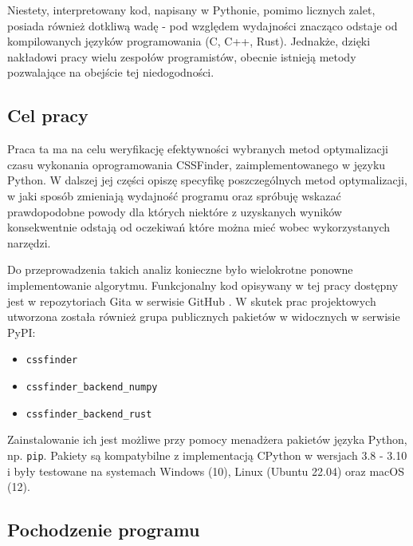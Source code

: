 \documentclass[12pt, a4paper]{article}
\newcommand{\code}[1]{\texttt{#1}}
\begin{document}
\begin{sloppypar}
    Niestety, interpretowany kod, napisany w Pythonie, pomimo licznych zalet, posiada również
    dotkliwą wadę - pod względem wydajności znacząco odstaje od kompilowanych języków programowania
    (C\cite{C_vs_Python}, C++\cite{Cpp_vs_Python}, Rust\cite{Rust_vs_Python}). Jednakże,
    dzięki nakładowi pracy wielu zespołów programistów, obecnie istnieją metody pozwalające
    na obejście tej niedogodności.

    \subsection{Cel pracy}


    Praca ta ma na celu weryfikację efektywności wybranych metod optymalizacji czasu wykonania
    oprogramowania CSSFinder, zaimplementowanego w języku Python. W dalszej jej części opiszę
    specyfikę poszczególnych metod optymalizacji, w jaki sposób zmieniają wydajność
    programu oraz spróbuję wskazać prawdopodobne powody dla których niektóre z
    uzyskanych wyników konsekwentnie odstają od oczekiwań które można mieć wobec
    wykorzystanych narzędzi.

    Do przeprowadzenia takich analiz konieczne było wielokrotne ponowne implementowanie
    algorytmu. Funkcjonalny kod opisywany w tej pracy dostępny jest w repozytoriach Gita\cite{Git_Com}
    w serwisie GitHub \cite{CSSFinder_New}\cite{CSSFinder_New_Numpy}\cite{CSSFinder_New_Rust}.
    W skutek prac projektowych utworzona została również grupa publicznych pakietów w widocznych
    w serwisie PyPI:
    \begin{itemize}
      \item \code{cssfinder}\cite{CSSFinder_New_PyPI}

      \item \code{cssfinder\_backend\_numpy}\cite{CSSFinder_New_Numpy_PyPI}

      \item \code{cssfinder\_backend\_rust}\cite{CSSFinder_New_Rust_PyPI}
    \end{itemize}
    Zainstalowanie ich jest możliwe przy pomocy menadżera pakietów języka Python\cite{Packaging_PEPs},
    np. \code{pip}\cite{PIP}. Pakiety są kompatybilne z implementacją CPython w wersjach
    3.8 - 3.10 i były testowane na systemach Windows (10), Linux (Ubuntu 22.04) oraz macOS
    (12).

    \subsection{Pochodzenie programu}



\end{sloppypar}
\end{document}
